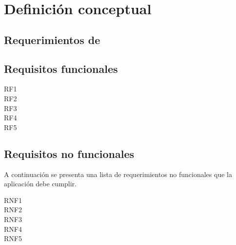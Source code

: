 \section{Definición conceptual}

\subsection{Requerimientos de }

\subsection*{Requisitos funcionales}

\begin{description}
\item [RF1]
\item [RF2]
\item [RF3]
\item [RF4]
\item [RF5]
\end{description}

\subsection*{Requisitos no funcionales}
A continuación se presenta una lista de requerimientos no funcionales que la aplicación debe cumplir. 

\begin{description}
\item [RNF1]
\item [RNF2]
\item [RNF3]
\item [RNF4]
\item [RNF5]
\end{description}